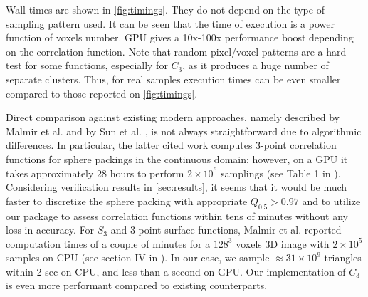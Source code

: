 \documentclass[reprint,amsmath,amssymb,aps,pre,showkeys,showpacs]{revtex4-1}
\begin{document}
Wall times are shown in \cref{fig:timings}. They do not depend on the type of
sampling pattern used. It can be seen that the time of execution is a power
function of voxels number. GPU gives a 10x-100x performance boost depending on
the correlation function. Note that random pixel/voxel patterns are a hard test
for some functions, especially for $C_3$, as it produces a huge number of
separate clusters. Thus, for real samples execution times can be even smaller
compared to those reported on \cref{fig:timings}.

Direct comparison against existing modern approaches, namely described by Malmir
et al. \cite{malmir2018} and by Sun et al. \cite{sun2022third}, is not always
straightforward due to algorithmic differences.  In particular, the latter cited
work computes 3-point correlation functions for sphere packings in the
continuous domain; however, on a GPU it takes approximately 28 hours to perform
$2\times10^6$ samplings (see Table 1 in \cite{sun2022third}).  Considering
verification results in \cref{sec:results}, it seems that it would be much
faster to discretize the sphere packing with appropriate $Q_{0.5} > 0.97$ and to
utilize our package to assess correlation functions within tens of minutes
without any loss in accuracy.  For $S_3$ and 3-point surface functions, Malmir
et al. reported computation times of a couple of minutes for a $128^3$ voxels 3D
image with $2\times10^5$ samples on CPU (see section IV in \cite{malmir2018}).
In our case, we sample $\approx 31\times10^9$ triangles within 2 sec on CPU, and
less than a second on GPU.  Our implementation of $C_3$ is even more performant
compared to existing counterparts.
\end{document}
